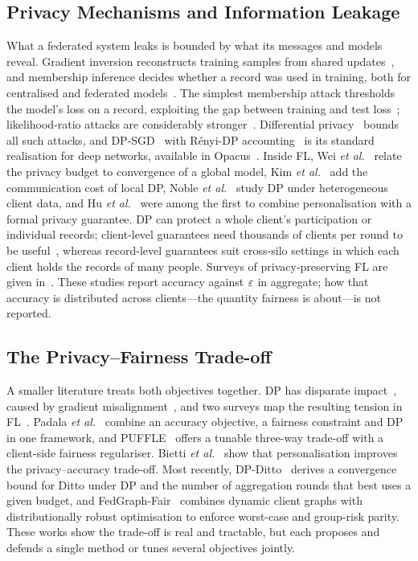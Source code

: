 \subsection{Privacy Mechanisms and Information Leakage}
What a federated system leaks is bounded by what its messages and models reveal. Gradient inversion reconstructs
training samples from shared updates~\cite{zhu2019deep}, and membership inference decides whether a record was used
in training, both for centralised and federated models~\cite{shokri2017membership,nasr2019comprehensive}. The
simplest membership attack thresholds the model's loss on a record, exploiting the gap between training and test
loss~\cite{yeom2018privacy}; likelihood-ratio attacks are considerably stronger~\cite{carlini2022membership}.
Differential privacy~\cite{dwork2006calibrating} bounds all such attacks, and DP-SGD~\cite{abadi2016deep} with
R\'enyi-DP accounting~\cite{mironov2017renyi} is its standard realisation for deep networks, available in
Opacus~\cite{yousefpour2021opacus}. Inside FL, Wei \emph{et al.}~\cite{wei2020federated} relate the privacy budget
to convergence of a global model, Kim \emph{et al.}~\cite{kim2021federated} add the communication cost of local DP,
Noble \emph{et al.}~\cite{noble2022differentially} study DP under heterogeneous client data, and Hu
\emph{et al.}~\cite{hu2020personalized} were among the first to combine personalisation with a formal privacy
guarantee. DP can protect a whole client's participation or individual records; client-level guarantees need
thousands of clients per round to be useful~\cite{kairouz2021advances}, whereas record-level guarantees suit
cross-silo settings in which each client holds the records of many people. Surveys of privacy-preserving FL are
given in~\cite{yin2021comprehensive,kairouz2021advances}. These studies report accuracy against $\varepsilon$ in
aggregate; how that accuracy is distributed across clients---the quantity fairness is about---is not reported.

\subsection{The Privacy--Fairness Trade-off}
A smaller literature treats both objectives together. DP has disparate impact~\cite{bagdasaryan2019differential},
caused by gradient misalignment~\cite{esipova2023disparate}, and two surveys map the resulting tension in
FL~\cite{chen2023privacy,rafi2024fairness}. Padala \emph{et al.}~\cite{padala2021federated} combine an accuracy
objective, a fairness constraint and DP in one framework, and PUFFLE~\cite{corbucci2024puffle} offers a tunable
three-way trade-off with a client-side fairness regulariser. Bietti \emph{et al.}~\cite{bietti2022personalization}
show that personalisation improves the privacy--accuracy trade-off. Most recently, DP-Ditto~\cite{zhao2025convergence}
derives a convergence bound for Ditto under DP and the number of aggregation rounds that best uses a given budget,
and FedGraph-Fair~\cite{khan2026fedgraph} combines dynamic client graphs with distributionally robust optimisation to
enforce worst-case and group-risk parity. These works show the trade-off is real and tractable, but each proposes
and defends a single method or tunes several objectives jointly.

